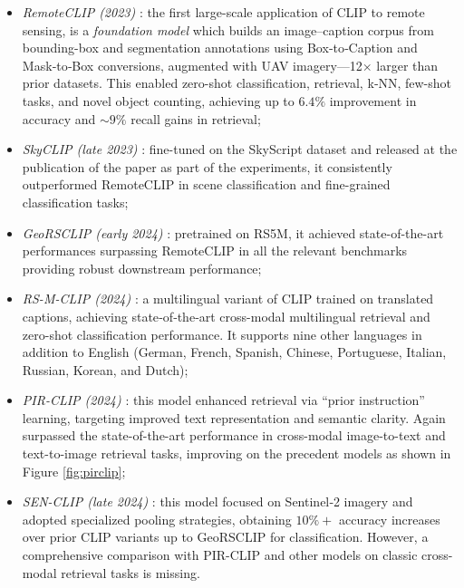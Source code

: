 \documentclass[a4paper, oneside, english]{sapthesis} %
\begin{document}
\begin{itemize}
    \item \emph{RemoteCLIP (2023)} \cite{liu2024remoteclip}: the first large-scale application of CLIP to remote sensing, is a \emph{foundation model} which builds an image–caption corpus from bounding-box and segmentation annotations using Box‑to‑Caption and Mask‑to‑Box conversions, augmented with UAV imagery—12× larger than prior datasets. This enabled zero-shot classification, retrieval, k‑NN, few-shot tasks, and novel object counting, achieving up to $6.4\%$ improvement in accuracy and $\sim 9\%$ recall gains in retrieval;
    \item \emph{SkyCLIP (late 2023)} \cite{wang2024skyscript}: fine-tuned on the SkyScript dataset and released at the publication of the paper as part of the experiments, it consistently outperformed RemoteCLIP in scene classification and fine-grained classification tasks;
    \item \emph{GeoRSCLIP (early 2024)} \cite{zhang2024rs5m}: pretrained on RS5M, it achieved state-of-the-art performances surpassing RemoteCLIP in all the relevant benchmarks providing robust downstream performance;
    \item \emph{RS-M-CLIP (2024)} \cite{silva2024multilingual}: a multilingual variant of CLIP trained on translated captions, achieving state‑of‑the‑art cross-modal multilingual retrieval and zero-shot classification performance. It supports nine other languages in addition to English (German, French, Spanish, Chinese, Portuguese, Italian, Russian, Korean, and Dutch);
    \item \emph{PIR-CLIP (2024)} \cite{pan2024pir}: this model enhanced retrieval via “prior instruction” learning, targeting improved text representation and semantic clarity. Again surpassed the state-of-the-art performance in cross-modal image-to-text and text-to-image retrieval tasks, improving on the precedent models as shown in Figure \ref{fig:pirclip};
    \item \emph{SEN-CLIP (late 2024)} \cite{jain2025senclip}: this model focused on Sentinel‑2 imagery and adopted specialized pooling strategies, obtaining $10\%+$ accuracy increases over prior CLIP variants up to GeoRSCLIP for classification. However, a comprehensive comparison with PIR-CLIP and other models on classic cross-modal retrieval tasks is missing.
\end{itemize}
\end{document}

